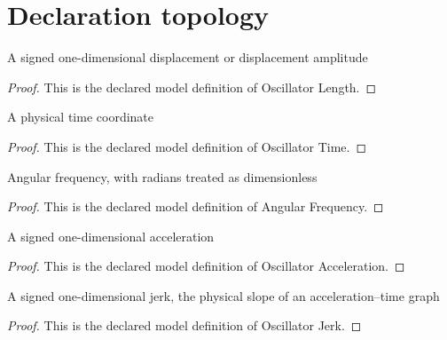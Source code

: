 \section{Declaration topology}
\begin{definition}
  \label{def:physics:phyx-mini-0277:phyxminiproblems-problemphyxmini0277-oscillatorlength}
  A signed one-dimensional displacement or displacement amplitude
\end{definition}
\begin{proof}
  This is the declared model definition of Oscillator Length.
\end{proof}
\begin{definition}
  \label{def:physics:phyx-mini-0277:phyxminiproblems-problemphyxmini0277-oscillatortime}
  A physical time coordinate
\end{definition}
\begin{proof}
  This is the declared model definition of Oscillator Time.
\end{proof}
\begin{definition}
  \label{def:physics:phyx-mini-0277:phyxminiproblems-problemphyxmini0277-angularfrequency}
  Angular frequency, with radians treated as dimensionless
\end{definition}
\begin{proof}
  This is the declared model definition of Angular Frequency.
\end{proof}
\begin{definition}
  \label{def:physics:phyx-mini-0277:phyxminiproblems-problemphyxmini0277-oscillatoracceleration}
  A signed one-dimensional acceleration
\end{definition}
\begin{proof}
  This is the declared model definition of Oscillator Acceleration.
\end{proof}
\begin{definition}
  \label{def:physics:phyx-mini-0277:phyxminiproblems-problemphyxmini0277-oscillatorjerk}
  A signed one-dimensional jerk, the physical slope of an acceleration--time graph
\end{definition}
\begin{proof}
  This is the declared model definition of Oscillator Jerk.
\end{proof}
